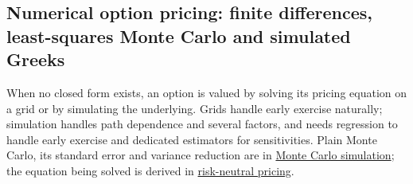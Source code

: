 \subsection{Numerical option pricing: finite differences, least-squares Monte Carlo and simulated Greeks}

When no closed form exists, an option is valued by solving its pricing equation on a grid or by simulating the underlying. Grids handle early exercise naturally; simulation handles path dependence and several factors, and needs regression to handle early exercise and dedicated estimators for sensitivities. Plain Monte Carlo, its standard error and variance reduction are in \hyperref[meth:monte-carlo-simulation]{Monte Carlo simulation}; the equation being solved is derived in \hyperref[res:risk-neutral-pricing-feynman-kac]{risk-neutral pricing}.

